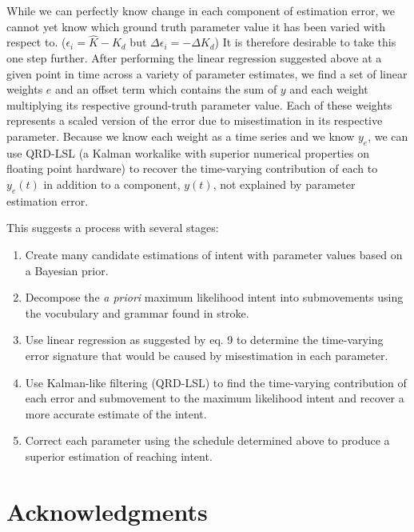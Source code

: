\documentclass[10pt]{article}
\begin{document}
While we can perfectly know change in each component of estimation error, we cannot yet know which ground truth parameter value it has been varied with respect to. ($\epsilon_i=\hat{K}-K_d$ but $\Delta \epsilon_i=-\Delta K_d$) It is therefore desirable to take this one step further. After performing the linear regression suggested above at a given point in time across a variety of parameter estimates, we find a set of linear weights $e$ and an offset term which contains the sum of $y$ and each weight multiplying its respective ground-truth parameter value. Each of these weights represents a scaled version of the error due to misestimation in its respective parameter. Because we know each weight as a time series and we know $y_e$, we can use QRD-LSL (a Kalman workalike with superior numerical properties on floating point hardware) to recover the time-varying contribution of each to $y_e(t)$ in addition to a component, $y(t)$, not explained by parameter estimation error.

This suggests a process with several stages:
\begin{enumerate}
  \item Create many candidate estimations of intent with parameter values based on a Bayesian prior.
  \item Decompose the \textit{a priori} maximum likelihood intent into submovements using the vocubulary and grammar found in stroke.
  \item Use linear regression as suggested by eq. 9 to determine the time-varying error signature that would be caused by misestimation in each parameter.
  \item Use Kalman-like filtering (QRD-LSL) to find the time-varying contribution of each error and submovement to the maximum likelihood intent and recover a more accurate estimate of the intent.
  \item Correct each parameter using the schedule determined above to produce a superior estimation of reaching intent.
\end{enumerate}


\section*{Acknowledgments}



\end{document}
